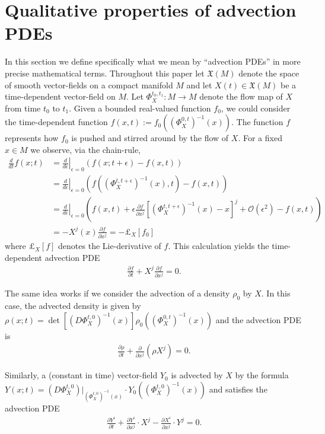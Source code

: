 \documentclass[12pt]{amsart}
\newcommand{\pder}[2]{\ensuremath{\frac{ \partial #1}{\partial #2}}}
\begin{document}
\section{Qualitative properties of advection PDEs}
\label{sec:properties}
In this section we define specifically what we mean by ``advection PDEs'' in more precise mathematical terms.
Throughout this paper let $\mathfrak{X}(M)$ denote the space of smooth vector-fields on a compact manifold $M$
and let $X(t) \in \mathfrak{X}(M)$ be a time-dependent vector-field on $M$.
Let $\Phi^{t_{0},t_{1}}_{X}:M\to M$ denote the flow map of $X$ from time $t_{0}$ to $t_{1}$.
Given a bounded real-valued function $f_{0}$, we could consider the time-dependent function $f(x,t) := f_{0} ( (\Phi_{X}^{0,t})^{-1}(x) )$.
The function $f$ represents how $f_{0}$ is pushed and stirred around by the flow of $X$.
For a fixed $x \in M$ we observe, via the chain-rule,
\begin{align}
	 \frac{d}{dt}  f(x;t) &=  \left. \frac{d}{d \epsilon} \right|_{\epsilon=0} ( f(x;t+\epsilon) - f(x,t) ) \\
	 &=  \left. \frac{d}{d \epsilon} \right|_{\epsilon=0} \left( f( (\Phi_{X}^{t,t+\epsilon})^{-1}(x) , t ) - f(x,t) \right) \\
	 &=  \left. \frac{d}{d \epsilon} \right|_{\epsilon=0} \left( f(x,t) + \epsilon \pder{f}{x^{j}} [ (\Phi_{X}^{t,t+\epsilon})^{-1}(x) - x ]^{j} + \mathcal{O}(\epsilon^{2}) - f(x,t) \right) \\
	 &= - X^{j}(x) \pder{f}{x^{j}} = - \pounds_{X}[f_{0}]
\end{align}
where $\pounds_{X}[f]$ denotes the Lie-derivative of $f$.
This calculation yields the time-dependent advection PDE
\begin{align}\label{eq:function pde}
	\pder{f}{t} + X^{j} \pder{f}{x^{j}} = 0.
\end{align}

The same idea works if we consider the advection of a density $\rho_{0}$ by $X$.
In this case, the advected density is given by $\rho (x ; t) =  \det\left[ (D\Phi_{X}^{t,0})^{-1} (x) \right] \rho_{0}( (\Phi_{X}^{0,t})^{-1}(x) )$
and the advection PDE is
\begin{align} \label{eq:density pde}
	\pder{\rho}{t} + \pder{}{x^{j}} \left( \rho X^{j} \right) = 0.
\end{align}

Similarly, a (constant in time) vector-field $Y_{0}$ is advected by $X$ by the formula $Y(x ; t) =  (D\Phi_{X}^{t,0})|_{(\Phi_{X}^{t,0})^{-1}(x)} \cdot Y_{0}( (\Phi_{X}^{t,0})^{-1}(x))$
and satisfies the advection PDE
\begin{align} \label{eq:vector field pde}
	\pder{Y^{i}}{t} + \pder{Y^{i}}{x^{j}} \cdot X^{j} - \pder{X^{i}}{x^{j}} \cdot Y^{j} = 0.
\end{align}
\end{document}
